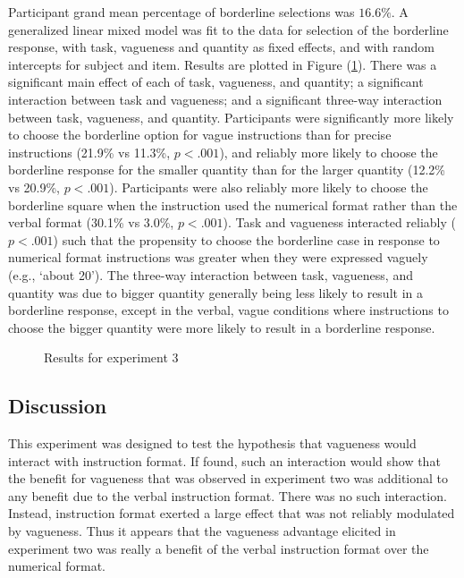 \documentclass[doc,floatmark]{apa}
\begin{document}
Participant grand mean percentage of borderline selections was $16.6\%$. A generalized linear mixed model \cite{jaeger2008categorical} was fit to the data for selection of the borderline response, with task, vagueness and quantity as fixed effects, and with random intercepts for subject and item. Results are plotted in Figure (\ref{resultse3}). There was a significant main effect of each of task, vagueness, and quantity;  a significant interaction between task and vagueness; and a significant three-way interaction between task, vagueness, and quantity. Participants were significantly more likely to choose the borderline option for vague instructions than for precise instructions (21.9\% vs 11.3\%, $p<.001$), and reliably more likely to choose the borderline response for the smaller quantity than for the larger quantity (12.2\% vs 20.9\%, $p<.001$). Participants were also reliably more likely to choose the borderline square when the instruction used the numerical format rather than the verbal format (30.1\% vs 3.0\%, $p<.001$). Task and vagueness interacted reliably ($p<.001$) such that the propensity to choose the borderline case in response to numerical format instructions was greater when they were expressed vaguely (e.g., `about 20'). The three-way interaction between task, vagueness, and quantity was due to bigger quantity generally being less likely to result in a borderline response, except in the verbal, vague conditions where instructions to choose the bigger quantity were more likely to result in a borderline response. 

\begin{figure}[htbp]
\caption{Results for experiment 3}
\label{resultse3}
\end{figure}

\subsection{Discussion}

This experiment was designed to test the hypothesis that vagueness would interact with instruction format. If found, such an interaction would show that the benefit for vagueness that was observed in experiment two was additional to any benefit due to the verbal instruction format. There was no such interaction. Instead, instruction format exerted a large effect that was not reliably modulated by vagueness. Thus it appears that the vagueness advantage elicited in experiment two was really a benefit of the verbal instruction format over the numerical format.
\end{document}
